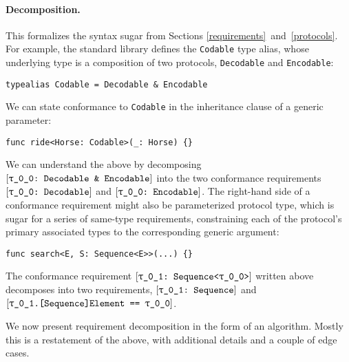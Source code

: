 \documentclass[../generics]{subfiles}
\begin{document}
\paragraph{Decomposition.} This formalizes the syntax sugar from Sections \ref{requirements}~and~\ref{protocols}. For example, the standard library defines the \texttt{Codable} type alias, whose underlying type is a composition of two protocols, \texttt{Decodable} and \texttt{Encodable}:
\begin{Verbatim}
typealias Codable = Decodable & Encodable
\end{Verbatim}
We can state conformance to \texttt{Codable} in the inheritance clause of a generic parameter:
\begin{Verbatim}
func ride<Horse: Codable>(_: Horse) {}
\end{Verbatim}
We can understand the above by decomposing $\ConfReq{\rT}{Decodable \& Encodable}$ into the two conformance requirements $\ConfReq{\rT}{Decodable}$ and $\ConfReq{\rT}{Encodable}$. The right-hand side of a conformance requirement might also be parameterized protocol type, which is sugar for a series of same-type requirements, constraining each of the protocol's primary associated types to the corresponding generic argument:
\begin{Verbatim}
func search<E, S: Sequence<E>>(...) {}
\end{Verbatim}
The conformance requirement $\ConfReq{\rU}{Sequence<\rT>}$ written above decomposes into two requirements, $\ConfReq{\rU}{Sequence}$ and $\SameReq{\rU.[Sequence]Element}{\rT}$.

We now present requirement decomposition in the form of an algorithm. Mostly this is a restatement of the above, with additional details and a couple of edge cases.
\end{document}
